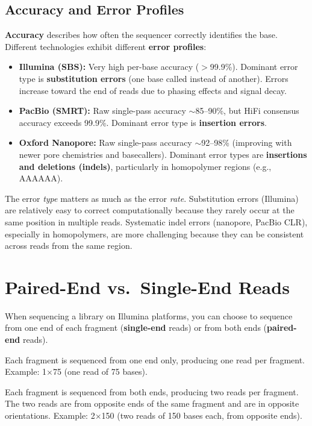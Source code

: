 \subsection{Accuracy and Error Profiles}
\label{subsec:seqprinciples:accuracy}

\textbf{Accuracy} describes how often the sequencer correctly identifies the base. Different technologies exhibit different \textbf{error profiles}:

\begin{itemize}[itemsep=2pt]
  \item \textbf{Illumina (SBS):} Very high per-base accuracy ($>$99.9\%). Dominant error type is \textbf{substitution errors} (one base called instead of another). Errors increase toward the end of reads due to phasing effects and signal decay.
  \item \textbf{PacBio (SMRT):} Raw single-pass accuracy $\sim$85--90\%, but HiFi consensus accuracy exceeds 99.9\%. Dominant error type is \textbf{insertion errors}.
  \item \textbf{Oxford Nanopore:} Raw single-pass accuracy $\sim$92--98\% (improving with newer pore chemistries and basecallers). Dominant error types are \textbf{insertions and deletions (indels)}, particularly in homopolymer regions (e.g., AAAAAA).
\end{itemize}

\begin{warningbox}
The error \textit{type} matters as much as the error \textit{rate}. Substitution errors (Illumina) are relatively easy to correct computationally because they rarely occur at the same position in multiple reads. Systematic indel errors (nanopore, PacBio CLR), especially in homopolymers, are more challenging because they can be consistent across reads from the same region.
\end{warningbox}


\section{Paired-End vs.\ Single-End Reads}
\label{sec:seqprinciples:paired-end}

When sequencing a library on Illumina platforms, you can choose to sequence from one end of each fragment (\textbf{single-end} reads) or from both ends (\textbf{paired-end} reads).

\begin{description}[style=nextline, itemsep=3pt]
  \item[Single-end (SE) sequencing] Each fragment is sequenced from one end only, producing one read per fragment. Example: 1$\times$75\basepair{} (one read of 75 bases).

  \item[Paired-end (PE) sequencing] Each fragment is sequenced from both ends, producing two reads per fragment. The two reads are from opposite ends of the same fragment and are in opposite orientations. Example: 2$\times$150\basepair{} (two reads of 150 bases each, from opposite ends).
\end{description}

